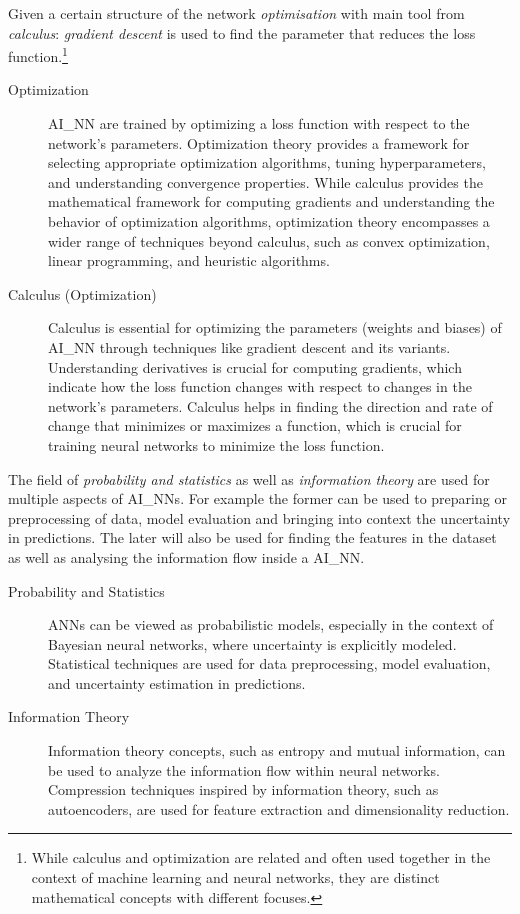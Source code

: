 Given a certain structure of the network \textit{optimisation} with main tool from \textit{calculus}: \textit{gradient descent} is used to find the parameter that reduces the loss function.\footnote{
	While calculus and optimization are related and often used together in the context of machine learning and neural networks, they are distinct mathematical concepts with different focuses.
}

\begin{description}
	\item[Optimization] \gls{AI_NN} are trained by optimizing a loss function with respect to the network's parameters. Optimization theory provides a framework for selecting appropriate optimization algorithms, tuning hyperparameters, and understanding convergence properties. While calculus provides the mathematical framework for computing gradients and understanding the behavior of optimization algorithms, optimization theory encompasses a wider range of techniques beyond calculus, such as convex optimization, linear programming, and heuristic algorithms.
	\item[Calculus (Optimization)] Calculus is essential for optimizing the parameters (weights and biases) of \gls{AI_NN} through techniques like gradient descent and its variants. Understanding derivatives is crucial for computing gradients, which indicate how the loss function changes with respect to changes in the network's parameters. Calculus helps in finding the direction and rate of change that minimizes or maximizes a function, which is crucial for training neural networks to minimize the loss function.
\end{description}

The field of \textit{probability and statistics} as well as \textit{information theory} are used for multiple aspects of \glspl{AI_NN}. For example the former can be used to preparing or preprocessing of data, model evaluation and bringing into context the uncertainty in predictions. The later will also be used for finding the features in the dataset as well as analysing the information flow inside a \gls{AI_NN}.

\begin{description}
	\item[Probability and Statistics] ANNs can be viewed as probabilistic models, especially in the context of Bayesian neural networks, where uncertainty is explicitly modeled. Statistical techniques are used for data preprocessing, model evaluation, and uncertainty estimation in predictions.
	\item[Information Theory] Information theory concepts, such as entropy and mutual information, can be used to analyze the information flow within neural networks. Compression techniques inspired by information theory, such as autoencoders, are used for feature extraction and dimensionality reduction.
\end{description}

